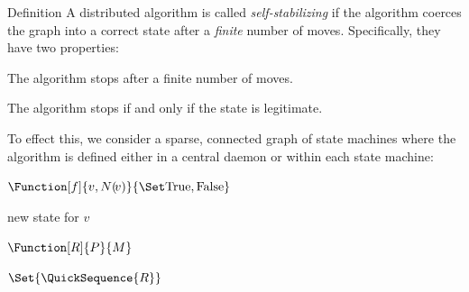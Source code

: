 \documentclass{beamer}
\begin{document}
\begin{frame}[fragile,t]
\begin{columns}[t]
\begin{column}{.45\textwidth}
      \begin{block}{Definition}
        A distributed algorithm is called \textit{self-stabilizing} if
        the algorithm coerces the graph into a correct state after a
        \emph{finite} number of moves.  Specifically, they have two properties:
        \begin{description}[algorithmMMMM]
        \item[convergence] The algorithm stops after a finite number of moves.
        \item[closure] The algorithm stops if and only if the state is legitimate.
        \end{description}
        To effect this, we consider a sparse, connected graph of state machines where
          the algorithm is defined either in a central daemon or within each state machine:
        \begin{description}[algorithmMMMM]
        \item[predicate] $\Function[f]{v, N(\!v)}{\SetBoolean}$
        \item[move] new state for $v$
        \item[rule] $\Function[R]{P}{M}$
        \item[algorithm] $\Set{\QuickSequence{R}}$
        \end{description}
        \begin{center}
\end{center}
\end{block}
\end{column}
\end{columns}
\end{frame}
\end{document}

